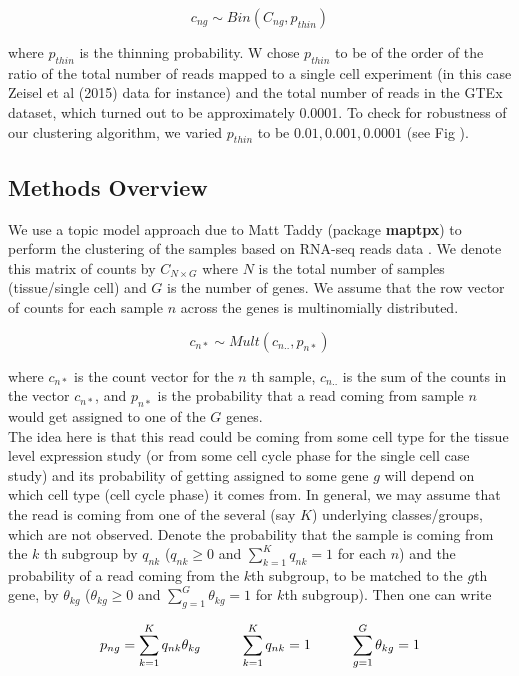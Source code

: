 $$ c_{ng}  \sim Bin(C_{ng}, p_{thin} )  $$

where $p_{thin}$ is the thinning probability. W chose $p_{thin}$ to be of the order of the ratio of the total number of reads mapped to a single cell experiment (in this case Zeisel et al (2015) data for instance) and the total number of reads in the GTEx dataset, which turned out to be approximately 0.0001. To check for robustness of our clustering algorithm, we varied $p_{thin}$ to be $0.01, 0.001, 0.0001$ (see Fig ).  

\subsection{Methods Overview}

We use a topic model approach due to Matt Taddy (package \textbf{maptpx}) to perform the clustering of the samples based on RNA-seq reads data \cite{Taddy2012}. We denote this matrix of counts by $C_{N \times G}$ where $N$ is the total number of samples (tissue/single cell) and $G$ is the number of genes.  We assume that the row vector of counts for each sample $n$ across the genes is multinomially distributed. 

$$ c_{n*} \sim Mult(c_{n..}, p_{n*}) $$

where $c_{n*}$ is the count vector for the $n$ th sample, $c_{n..}$ is the sum of the counts in the vector $c_{n*}$, and $p_{n*}$ is the probability that a read coming from sample $n$ would get assigned to one of the $G$ genes. \\[2 pt]
The idea here is that this read could be coming from some cell type for the tissue level expression study (or from some cell cycle phase for the single cell case study) and its probability of getting assigned to some gene $g$ will depend on which cell type (cell cycle phase) it comes from. In general, we may assume that the read is coming from one of the several (say $K$) underlying classes/groups, which are not observed. Denote  the probability that the sample is coming from the $k$ th subgroup by $q_{nk}$ ($q_{nk} \geq 0$ and $\sum_{k=1}^{K} q_{nk} =1$ for each $n$) and the probability of a read coming from the $k$th subgroup, to be matched to the $g$th gene, by $\theta_{kg}$ ($\theta_{kg} \geq 0$ and $\sum_{g=1}^{G} \theta_{kg} =1$ for $k$th subgroup). Then one can write 

$$ p_{ng} = \sum_{k=1}^{K} q_{nk}\theta_{kg}   \hspace{1 cm}  \sum_{k=1}^{K} q_{nk}=1 \hspace{1 cm} \sum_{g=1}^{G} \theta_{kg}=1 $$

